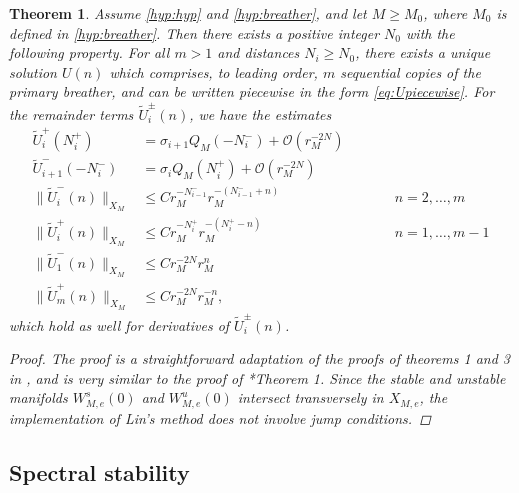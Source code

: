 \documentclass[12pt,reqno]{amsart}
\newtheorem{theorem}{Theorem}
\theoremstyle{definition}
\begin{document}
\begin{theorem}\label{th:multi-breathers}
Assume \cref{hyp:hyp} and \cref{hyp:breather}, and let $M \geq M_0$, where $M_0$ is defined in \cref{hyp:breather}. Then there exists a positive integer $N_0$ with the following property. For all $m > 1$ and distances $N_i \geq N_0$, there exists a unique solution $U(n)$ which comprises, to leading order, $m$ sequential copies of the primary breather, and can be written piecewise in the form \cref{eq:Upiecewise}. For the remainder terms $\tilde{U}_i^\pm(n)$, we have the estimates
\begin{equation}\label{eq:Uestimates}
\begin{aligned}
\tilde{U}_i^+(N_i^+) &= \sigma_{i+1} Q_M(-N_i^-) + \mathcal{O}(r_M^{-2N}) \\
\tilde{U}_{i+1}^-(-N_i^-) &= \sigma_{i} Q_M(N_i^+) + \mathcal{O}(r_M^{-2N}) \\ 
\| \tilde{U}_i^-(n)\|_{X_M} &\leq C r_M^{-N_{i-1}^-} r_M^{-(N_{i-1}^- + n)} && \qquad n = 2, \dots, m\\
\|\tilde{U}_i^+(n) \|_{X_M} &\leq C r_M^{-N_i^+} r_M^{-(N_i^+ - n)} && \qquad n = 1, \dots, m-1 \\
\| \tilde{U}_1^-(n)\|_{X_M} &\leq C r_M^{-2N} r_M^{n} \\
\|\tilde{U}_m^+(n) \|_{X_M} &\leq C r_M^{-2N} r_M^{-n},
\end{aligned}
\end{equation}
which hold as well for derivatives of $\tilde{U}_i^\pm(n)$.
\begin{proof}
The proof is a straightforward adaptation of the proofs of theorems 1 and 3 in \cite{Parker2020}, and is very similar to the proof of \cite{Parker2021}*{Theorem 1}. Since the stable and unstable manifolds $W_{M,e}^s(0)$ and $W_{M,e}^u(0)$ intersect transversely in $X_{M,e}$, the implementation of Lin's method does not involve jump conditions.
\end{proof}
\end{theorem}

\subsection{Spectral stability}
\end{document}
